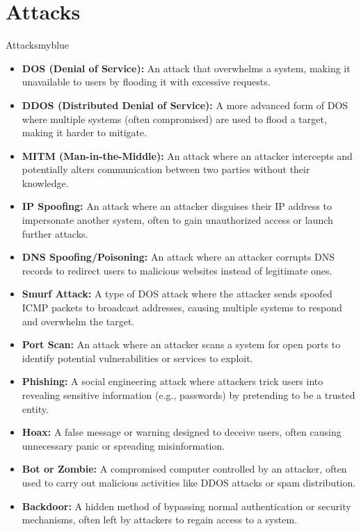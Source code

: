 \section{Attacks}
\begin{prettyBox}{Attacks}{myblue}
\begin{itemize}
\item \textbf{DOS (Denial of Service):} An attack that overwhelms a system, 
making it unavailable to users by flooding it with excessive requests.
\item \textbf{DDOS (Distributed Denial of Service):} A more advanced form of 
DOS where multiple systems (often compromised) are used to flood a target, 
making it harder to mitigate.
\item \textbf{MITM (Man-in-the-Middle):} An attack where an attacker 
intercepts and potentially alters communication between two parties without 
their knowledge.
\item \textbf{IP Spoofing:} An attack where an attacker disguises their IP 
address to impersonate another system, often to gain unauthorized access or 
launch further attacks.
\item \textbf{DNS Spoofing/Poisoning:} An attack where an attacker corrupts 
DNS records to redirect users to malicious websites instead of legitimate ones.
\item \textbf{Smurf Attack:} A type of DOS attack where the attacker sends 
spoofed ICMP packets to broadcast addresses, causing multiple systems to 
respond and overwhelm the target.
\item \textbf{Port Scan:} An attack where an attacker scans a system for open 
ports to identify potential vulnerabilities or services to exploit.
\item \textbf{Phishing:} A social engineering attack where attackers trick 
users into revealing sensitive information (e.g., passwords) by pretending to be a 
trusted entity.
\item \textbf{Hoax:} A false message or warning designed to deceive users, 
often causing unnecessary panic or spreading misinformation.
\item \textbf{Bot or Zombie:} A compromised computer controlled by an attacker, often used to carry out malicious activities like DDOS attacks or spam distribution.
\item \textbf{Backdoor:} A hidden method of bypassing normal authentication or 
security mechanisms, often left by attackers to regain access to a system.
\end{itemize}
\end{prettyBox}

